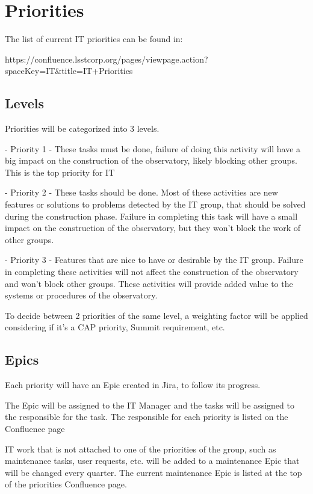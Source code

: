 \section{Priorities} \label{sec:priorities}


The list of current IT priorities can be found in:

https://confluence.lsstcorp.org/pages/viewpage.action?spaceKey=IT&title=IT+Priorities

\subsection{Levels }

Priorities will be categorized into 3 levels.

  - Priority 1 - These tasks must be done, failure of doing this activity will have a big impact on the construction of the observatory, likely blocking other groups. This is the top priority for IT

  - Priority 2 - These tasks should be done. Most of these activities are new features or solutions to problems detected by the IT group, that should be solved during the construction phase. Failure in completing this task will have a small impact on the construction of the observatory, but they won't block the work of other groups.

  - Priority 3 - Features that are nice to have or desirable by the IT group. Failure in completing these activities will not affect the construction of the observatory and won't block other groups. These activities will provide added value to the systems or procedures of the observatory.

To decide between 2 priorities of the same level, a weighting factor will be applied considering if it's a CAP priority, Summit requirement, etc.

\subsection{Epics }

Each priority will have an Epic created in Jira, to follow its progress.

The Epic will be assigned to the IT Manager and the tasks will be assigned to the responsible for the task. The responsible for each priority is listed on the Confluence page

IT work that is not attached to one of the priorities of the group, such as maintenance tasks, user requests, etc. will be added to a maintenance Epic that will be changed every quarter. The current maintenance Epic is listed at the top of the priorities Confluence page.

